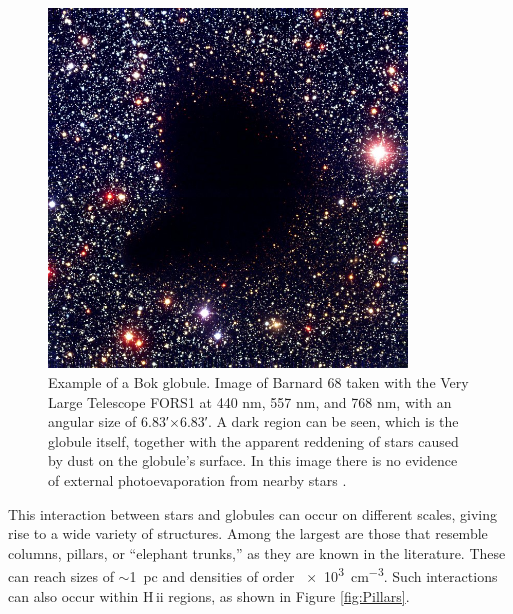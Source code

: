 \documentclass{book}
\begin{document}
\begin{figure}[htb]
    \centering
    \includegraphics[width=0.85\textwidth]{images Chapter 1/C1_Bok_globule.jpg}
    \caption{Example of a Bok globule. Image of Barnard 68 taken with
      the Very Large Telescope FORS1 at 440 nm, 557 nm, and 768 nm,
      with an angular size of \ang{;6.83;}$\times$\ang{;6.83;}. A dark
      region can be seen, which is the globule itself, together with
      the apparent reddening of stars caused by dust on the globule’s
      surface. In this image there is no evidence of external
      photoevaporation from nearby stars \citep{Alves:2001}.}
    \label{fig:Banard}
\end{figure}

This interaction between stars and globules can occur on different
scales, giving rise to a wide variety of structures. Among the largest
are those that resemble columns, pillars, or “elephant trunks,” as
they are known in the literature. These can reach sizes of
$\sim$\SI{1}{pc} and densities of order \SI{e3}{cm^{-3}}. Such
interactions can also occur within H\,{\sc ii} regions, as shown in
Figure \ref{fig:Pillars}.
\end{document}
